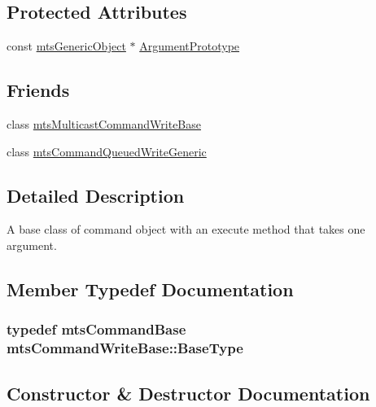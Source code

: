 \subsection*{Protected Attributes}
\begin{DoxyCompactItemize}
\item 
const \hyperlink{classmts_generic_object}{mts\+Generic\+Object} $\ast$ \hyperlink{classmts_command_write_base_a92e316a7f32f52a18b47a02867b104d2}{Argument\+Prototype}
\end{DoxyCompactItemize}
\subsection*{Friends}
\begin{DoxyCompactItemize}
\item 
class \hyperlink{classmts_command_write_base_a01bea616c1ae77f302ccedbbc1300c12}{mts\+Multicast\+Command\+Write\+Base}
\item 
class \hyperlink{classmts_command_write_base_aebd3531dc414cbd5c5aff710ecbfac4f}{mts\+Command\+Queued\+Write\+Generic}
\end{DoxyCompactItemize}


\subsection{Detailed Description}
A base class of command object with an execute method that takes one argument. 

\subsection{Member Typedef Documentation}
\hypertarget{classmts_command_write_base_a5d78c8590cfc73fa29d93b3678cba199}{}
\subsubsection[{Base\+Type}]{\setlength{\rightskip}{0pt plus 5cm}typedef {\bf mts\+Command\+Base} {\bf mts\+Command\+Write\+Base\+::\+Base\+Type}}\label{classmts_command_write_base_a5d78c8590cfc73fa29d93b3678cba199}


\subsection{Constructor \& Destructor Documentation}
\hypertarget{classmts_command_write_base_a6f4d5fca6143636b3f0b55c99e1807fb}{}
